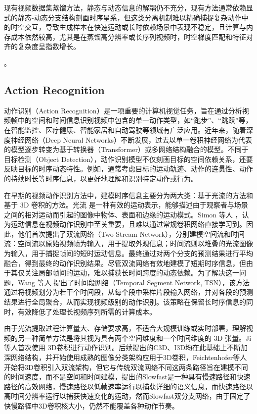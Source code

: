 \documentclass[10.5pt,letterpaper]{article}
\begin{document}
现有视频数据集蒸馏方法，静态与动态信息的解耦仍不充分，现有方法通常依赖显式的静态-动态分支结构刻画时序星系，但这类分离机制难以精确捕捉复杂动作中的时空交互，导致生成样本在快速运动或长时依赖场景中表现不稳定，且计算与内存成本依然较高，尤其是在蒸馏高分辨率或长序列视频时，时空梯度匹配和特征对齐的复杂度呈指数增长。

。

\subsection{Action Recognition}
动作识别（Action Recognition）是一项重要的计算机视觉任务，旨在通过分析视频帧中的空间和时间信息识别视频中包含的单一动作类型，如“跑步”、“跳跃”等，在智能监控、医疗健康、智能家居和自动驾驶等领域有广泛应用。近年来，随着深度神经网络（Deep Neural Networks）不断发展\cite{krizhevsky-nips2012-imagenet}，过去以单一卷积神经网络为代表的模型逐步转变为基于转换器（Transformer）\cite{vaswani-nips2017-attention}或多网络结构融合的模型。不同于目标检测（Object Detection），动作识别模型不仅刻画目标的空间依赖关系，还要反映目标的时序动态特性。例如，通常考虑目标的运动轨迹、动作的连贯性、动作的持续时长等时序信息，以更好地理解和识别特定动作或行为。

在早期的视频动作识别方法中，建模时序信息主要分为两大类：基于光流的方法和基于 3D 卷积的方法。光流 \cite{horn-ai1981-determining} 是一种有效的运动表示，能够描述由于观察者与场景之间的相对运动而引起的图像中物体、表面和边缘的运动模式。Simon 等人 \cite{simon-nips2014-twostream}，认为运动信息在视频动作识别中至关重要，且难以通过常规卷积网络直接学习到。因此，他们首次提出了双流网络（Two-Stream Network），分别建模空间流和时间流：空间流以原始视频帧为输入，用于提取外观信息；时间流则以堆叠的光流图像为输入，用于捕捉帧间的短时运动信息。最终通过对两个分支的预测结果进行平均融合，得到最终的动作识别结果。尽管双流网络有效地建模了短期时序信息，但由于其仅关注局部帧间的运动，难以捕获长时间跨度的动态依赖。为了解决这一问题，Wang 等人 \cite{wang-eccv2016-action} 提出了时间段网络（Temporal Segment Network, TSN），该方法通过将视频划分为若干个时间段，从每个段中采样片段输入网络，并对各段的预测结果进行全局聚合，从而实现视频级别的动作识别。该策略在保留长时序信息的同时，有效降低了处理长视频序列所需的计算成本。

由于光流提取过程计算量大、存储要求高，不适合大规模训练或实时部署，理解视频的另一种简单方法是将其视为具有两个空间维度和一个时间维度的 3D 张量。Ji等人\cite{ji-tpami2012-3d}首次使用 3D卷积进行动作识别。后续提出的C3D\cite{tran-cvpr2015-learning}、I3D\cite{carreira-cvpr2017-kinetics}均在此基础上不断加深网络结构，并开始使用成熟的图像分类架构应用于3D卷积，Feichtenhofer等人开始将3D卷积引入双流架构，但它与传统双流网络不同这两条路径旨在建模不同的时间速度，而不是空间和时间建模，提出的Slowfast\cite{feichtenhofer-iccv2019-slowfast}是一种具有慢速路径和快速路径的高效网络，慢速路径以低帧速率运行以捕获详细的语义信息，而快速路径以高时间分辨率运行以捕获快速变化的运动，然而Slowfast双分支网络，由于固定了快慢路径中3D卷积核大小，仍然不能覆盖各种动作节奏。
\end{document}
